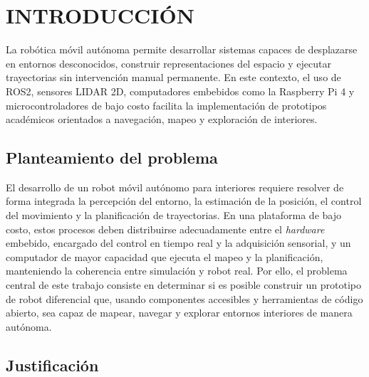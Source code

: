 \chapter*{INTRODUCCIÓN}
{}

La robótica móvil autónoma permite desarrollar sistemas capaces de desplazarse en entornos desconocidos, construir representaciones del espacio y ejecutar trayectorias sin intervención manual permanente. En este contexto, el uso de \gls{ROS2}, sensores \gls{LIDAR} 2D, computadores embebidos como la Raspberry Pi 4 y microcontroladores de bajo costo facilita la implementación de prototipos académicos orientados a navegación, mapeo y exploración de interiores.

\section*{Planteamiento del problema}
{}

El desarrollo de un robot móvil autónomo para interiores requiere resolver de forma integrada la percepción del entorno, la estimación de la posición, el control del movimiento y la planificación de trayectorias. En una plataforma de bajo costo, estos procesos deben distribuirse adecuadamente entre el \textit{hardware} embebido, encargado del control en tiempo real y la adquisición sensorial, y un computador de mayor capacidad que ejecuta el mapeo y la planificación, manteniendo la coherencia entre simulación y robot real. Por ello, el problema central de este trabajo consiste en determinar si es posible construir un prototipo de robot diferencial que, usando componentes accesibles y herramientas de código abierto, sea capaz de mapear, navegar y explorar entornos interiores de manera autónoma.

\section*{Justificación}
{}

